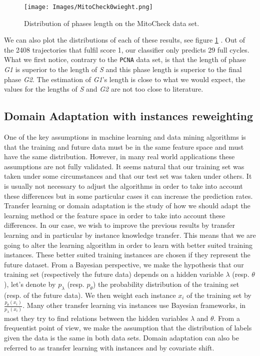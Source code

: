 \documentclass{article}
\begin{document}
\begin{figure}[!ht]
\centering
\texttt{[image: Images/MitoCheck0wieght.png]}
\caption{Distribution of phases length on the MitoCheck data set.}
\label{fig: resMitoCheck}
\end{figure} 


We can also plot the distributions of each of these results, see figure \ref{fig: resMitoCheck} . Out of the 2408 trajectories that fulfil score 1, our classifier only predicts 29 full cycles. What we first notice, contrary to the \texttt{PCNA} data set, is that the length of phase \textit{G1} is superior to the length of \textit{S} and this phase length is superior to the final phase \textit{G2}. The estimation of \textit{G1}'s length is close to what we would expect, the values for the lengths of \textit{S} and \textit{G2} are not too close to literature.

\subsection{Domain Adaptation with instances reweighting}



One of the key assumptions in machine learning and data mining algorithms is that the training and future data must be in the same feature space and must have the same distribution. However, in many real world applications these assumptions are not fully validated. It seems natural that our training set was taken under some circumstances and that our test set was taken under others. It is usually not necessary to adjust the algorithms in order to take into account these differences but in some particular cases it can increase the prediction rates. Transfer learning or domain adaptation is the study of how we should adapt the learning method or the feature space in order to take into account these differences. In our case, we wish to improve the previous results by transfer learning and in particular by instance knowledge transfer. This means that we are going to alter the learning algorithm in order to learn with better suited training instances. These better suited training instances are chosen if they represent the future dataset. From a Bayesian perspective, we make the hypothesis that our training set (respectively the future data) depends on a hidden variable $\lambda$ (resp. $\theta$), let's denote by $p_{\lambda}$ (resp. $p_{\theta}$) the probability distribution of the training set (resp. of the future data). We then weight each instance $x_i$ of the training set by $\frac{p_{\theta}(x_i)}{p_{\lambda}(x_i)}$. Many other transfer learning via instances use Bayesian frameworks, in most they try to find relations between the hidden variables $\lambda$ and $\theta$. From a frequentist point of view, we make the assumption that the distribution of labels given the data is the same in both data sets. Domain adaptation can also be referred to as transfer learning with instances and by covariate shift.
\end{document}
